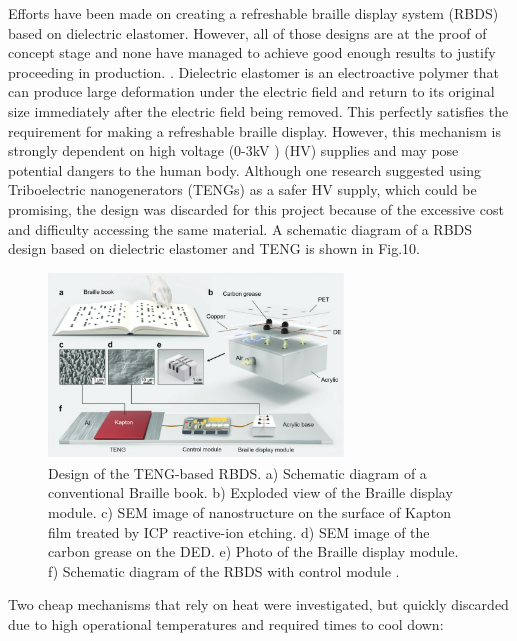 Efforts have been made on creating a refreshable braille display system (RBDS) based on dielectric elastomer. However, all of those designs are at the proof of concept stage and none have managed to achieve good enough results to justify proceeding in production. \cite{qu_refreshable_2021}.
Dielectric elastomer is an electroactive polymer that can produce large deformation under the electric field and return to its original size immediately after the electric field being removed.
This perfectly satisfies the requirement for making a refreshable braille display. 
However, this mechanism is strongly dependent on high voltage (0-3kV \cite{qu_refreshable_2021}) (HV) supplies and may pose potential dangers to the human body.
Although one research suggested using Triboelectric nanogenerators (TENGs) as a safer HV supply, which could be promising, the design was discarded for this project because of the excessive cost and difficulty accessing the same material. 
A schematic diagram of a RBDS design based on dielectric elastomer and TENG is shown in Fig.10.

\begin{figure}[h]\centering
    \includegraphics[width=0.7\textwidth]{figures/teng.png}
    \caption[Dielectric elastomer Braille display]{Design of the TENG-based RBDS. a) Schematic diagram of a conventional Braille book. b) Exploded view of the Braille display module. c) SEM image of nanostructure on the surface of Kapton film treated by ICP reactive-ion etching. d) SEM image of the carbon grease on the DED. e) Photo of the Braille display module. f) Schematic diagram of the RBDS with control module \cite{qu_refreshable_2021}.}
    \label{fig:teng.png}
\end{figure}

Two cheap mechanisms that rely on heat were investigated, but quickly discarded due to high operational temperatures and required times to cool down:

